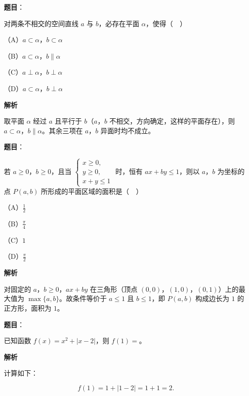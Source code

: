 \begin{answer}

\textbf{题目}：

对两条不相交的空间直线 $a$ 与 $b$，必存在平面 $\alpha$，使得（　）

（A）$a\subset\alpha$，$b\subset\alpha$

（B）$a\subset\alpha$，$b\parallel\alpha$

（C）$a\perp\alpha$，$b\perp\alpha$

（D）$a\subset\alpha$，$b\perp\alpha$

\textbf{解析}

取平面 $\alpha$ 经过 $a$ 且平行于 $b$（$a$，$b$ 不相交，方向确定，这样的平面存在），则 $a\subset\alpha$，$b\parallel\alpha$。其余三项在 $a$，$b$ 异面时均不成立。


\end{answer}
\begin{answer}

\textbf{题目}：

若 $a\geqslant0$，$b\geqslant0$，且当 $\begin{cases}x\geqslant0,\\ y\geqslant0,\\ x+y\leqslant1\end{cases}$ 时，恒有 $ax+by\leqslant1$，则以 $a$，$b$ 为坐标的点 $P(a,b)$ 所形成的平面区域的面积是（　）

（A）$\frac12$

（B）$\frac{\pi}4$

（C）$1$

（D）$\frac{\pi}2$

\textbf{解析}

对固定的 $a$，$b\geqslant0$，$ax+by$ 在三角形（顶点 $(0,0)$，$(1,0)$，$(0,1)$）上的最大值为 $\max\{a,b\}$。故条件等价于 $a\leqslant1$ 且 $b\leqslant1$，即 $P(a,b)$ 构成边长为 $1$ 的正方形，面积为 $1$。


\end{answer}
\begin{answer}

\textbf{题目}：

已知函数 $f(x)=x^2+|x-2|$，则 $f(1)=$\gkblank{}。

\textbf{解析}

计算如下：

\nopagebreak[4]
\[f(1)=1+|1-2|=1+1=2.\]


\end{answer}
